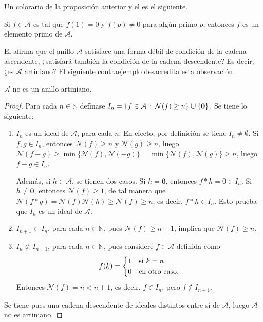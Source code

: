 Un colorario de la proposición anterior y el  es el siguiente.

\begin{corollary}
Si $f \in \mathcal{A}$ es tal que $f(1) = 0$ y $f(p) \ne 0$ para algún primo $p$, entonces $f$ es un elemento primo de $\mathcal{A}$.
\end{corollary}

El  afirma que el anillo $\mathcal{A}$ satisface una forma débil de condición de la cadena ascendente, ¿satisfará también la condición de la cadena descendente? Es decir, ¿es $\mathcal{A}$ artiniano? El siguiente contraejemplo desacredita esta observación.

\begin{proposition}
$\mathcal{A}$ no es un anillo artiniano.
\end{proposition}
\begin{proof}
Para cada $n \in \mathbb{N}$ defínase $I_n = \{ f \in \mathcal{A} \std \mathcal{N}(f) \ge n \} \cup \{ \mathbf{0} \}$. Se tiene lo siguiente:\begin{enumerate}[label=\textnormal{(\arabic*)}]
\item $I_n$ es un ideal de $\mathcal{A}$, para cada $n$. En efecto, por definición se tiene $I_n \ne \emptyset$. Si $f,g \in I_n$, entonces $\mathcal{N}(f) \ge n$ y $\mathcal{N}(g) \ge n$, luego $\mathcal{N}(f-g) \ge \min \{ \mathcal{N}(f), \mathcal{N}(-g) \} = \min \{ \mathcal{N}(f),\mathcal{N}(g) \} \ge n$, luego $f-g \in I_n$.
\bigskip

Además, si $h \in \mathcal{A}$, se tienen dos casos. Si $h=\mathbf{0}$, entonces $f*h=0 \in I_n$. Si $h \ne \mathbf{0}$, entonces $\mathcal{N}(f) \ge 1$, de tal manera que $\mathcal{N}(f*g)=\mathcal{N}(f)\mathcal{N}(h) \ge \mathcal{N}(f) \ge n$, es decir, $f*h \in I_n$. Esto prueba que $I_n$ es un ideal de $\mathcal{A}$.
\item $I_{n+1} \subset I_n$, para cada $n \in \mathbb{N}$, pues $\mathcal{N}(f) \ge n+1$, implica que $\mathcal{N}(f) \ge n$.
\item $I_n \not \subset I_{n+1}$, para cada $n \in \mathbb{N}$, pues considere $f \in \mathcal{A}$ definida como
\begin{equation*}
    f(k) = \begin{cases}
        \hfil 1 & \text{si } k=n \\
        \hfil 0 & \text{en otro caso.}
    \end{cases}
\end{equation*}
Entonces $\mathcal{N}(f) = n < n+1$, es decir, $f \in I_n$, pero $f \notin I_{n+1}$.
\end{enumerate}
Se tiene pues una cadena descendente de ideales distintos entre sí de $\mathcal{A}$, luego $\mathcal{A}$ no es artiniano.
\end{proof}

